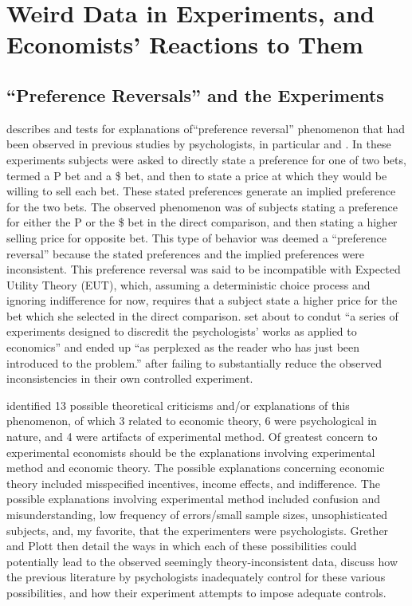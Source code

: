 \documentclass[../main.tex]{subfiles}
\begin{document}
\onehalfspacing
\setcounter{chapter}{0}
\chapter{Weird Data in Experiments, and Economists' Reactions to Them}

\lltoc

\section{\enquote{Preference Reversals} and the \texorpdfstring{\textcite{Grether1979}}{Grether \& Plott (1979)}  Experiments}

\textcite{Grether1979} describes and tests for explanations of\enquote{preference reversal} phenomenon that had been observed in previous studies by psychologists, in particular \textcite{Lichtenstein1971, Lichtenstein1973} and \textcite{Lindman1971}.
In these experiments subjects were asked to directly state a preference for one of two bets, termed a P bet and a \$ bet,  and then to state a price at which they would be willing to sell each bet.
These stated preferences generate an implied preference for the two bets.
The observed phenomenon was of subjects stating a preference for either the P or the \$ bet in the direct comparison, and then stating a higher selling price for opposite bet.
This type of behavior was deemed a \enquote{preference reversal} because the stated preferences and the implied preferences were inconsistent.
This preference reversal was said to be incompatible with Expected Utility Theory (EUT), which, assuming a deterministic choice process and ignoring indifference for now, requires that a subject state a higher price for the bet which she selected in the direct comparison.
\textcite[623]{Grether1979} set about to condut \enquote{a series of experiments designed to discredit the psychologists' works as applied to economics} and ended up \enquote{as perplexed as the reader who has just been introduced to the problem.} \parencite*[624]{Grether1979} after failing to substantially reduce the observed inconsistencies in their own controlled experiment.

\textcite{Grether1979} identified 13 possible theoretical criticisms and/or explanations of this phenomenon, of which 3 related to economic theory, 6 were psychological in nature, and 4 were artifacts of experimental method.
Of greatest concern to experimental economists should be the explanations involving experimental method and economic theory.
The possible explanations concerning economic theory included misspecified incentives, income effects, and indifference.
The possible explanations involving experimental method included confusion and misunderstanding, low frequency of errors/small sample sizes, unsophisticated subjects, and, my favorite, that the experimenters were psychologists.
Grether and Plott then detail the ways in which each of these possibilities could potentially lead to the observed seemingly theory-inconsistent data, discuss how the previous literature by psychologists inadequately control for these various possibilities, and how their experiment attempts to impose adequate controls.
\end{document}
